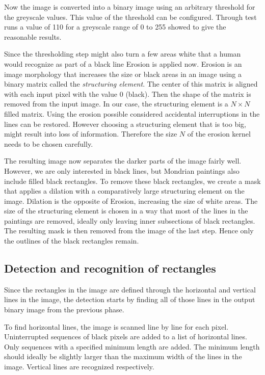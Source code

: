 Now the image is converted into a binary image using an arbitrary threshold for
the greyscale values. This value of the threshold can be configured. Through
test runs a value of 110 for a greyscale range of 0 to 255 showed to give the
reasonable results.

Since the thresholding step might also turn a few areas white that a human would
recognize as part of a black line Erosion is applied now. Erosion is an image
morphology that increases the size or black areas in an image using a binary
matrix called the \textit{structuring element}. The center of this matrix is
aligned with each input pixel with the value 0 (black). Then the shape of the
matrix is removed from the input image. In our case, the structuring element is
a $N\times N$ filled matrix. Using the erosion possible considered accidental
interruptions in the lines can be restored. However choosing a structuring
element that is too big, might result into loss of information. Therefore the
size $N$ of the erosion kernel needs to be chosen carefully.

The resulting image now separates the darker parts of the image fairly well.
However, we are only interested in black lines, but Mondrian paintings also
include filled black rectangles. To remove these black rectangles, we create a
mask that applies a dilation with a comparatively large structuring element on
the image. Dilation is the opposite of  Erosion, increasing the size of white
areas. The size of the structuring element is chosen in a way that most of the
lines in the paintings are removed, ideally only leaving inner subsections of
black rectangles. The resulting mask is then removed from the image of the last
step. Hence only the outlines of the black rectangles remain.

\subsection{Detection and recognition of rectangles}

Since the rectangles in the image are defined through the horizontal and
vertical lines in the image, the detection starts by finding all of those lines
in the output binary image from the previous phase.

To find horizontal lines, the image is scanned line by line for each pixel.
Uninterrupted sequences of black pixels are added to a list of horizontal lines.
Only sequences with a specified minimum length are added. The minimum length
should ideally be slightly larger than the maximum width of the lines in the
image. Vertical lines are recognized respectively.

